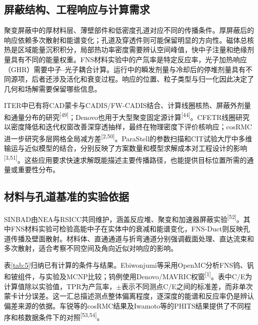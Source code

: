 \documentclass[UTF8, zihao=-4, fontset=none, a4paper]{ctexart}
\newcommand{\upcite}[1]{\textsuperscript{[#1]}}
\begin{document}
\subsection{屏蔽结构、工程响应与计算需求}

聚变屏蔽中的厚材料层、薄壁部件和低密度孔道对应不同的传播条件。厚屏蔽后的响应依赖多次散射和能谱变化；孔道及穿透件则可能保留明显的方向性。磁体总核热是区域能量沉积积分，局部热功率密度需要辨认空间峰值，快中子注量和绝缘剂量具有不同的能量权重。FNS材料实验中的产氚率是特定反应率，光子加热响应（GHR）需要中子--光子耦合计算。运行中的瞬发剂量与冷却后的停堆剂量具有不同源项，后者还涉及活化和衰变过程。响应的位置、粒子类型与归一化因此决定了几何和场解需要保留哪些信息。

ITER中已有将CAD蒙卡与CADIS/FW-CADIS结合、计算线圈核热、屏蔽外剂量和通量分布的研究\upcite{49}；Denovo也用于大型聚变固定源计算\upcite{44}。CFETR线圈研究以密度降低和迭代权窗改善深穿透抽样，最终在物理密度下评价核响应；cosRMC进一步研究多层网格全局减方差\upcite{2,50}。ParaStell的参数扫描和CIT试验大厅中多维输运与近似模型的结合，分别反映了方案数量和模型求解成本对工程设计的影响\upcite{3,51}。这些应用要求快速求解既能描述主要传播路径，也能提供目标位置所需的通量或重要性分布。

\subsection{材料与孔道基准的实验依据}

SINBAD由NEA与RSICC共同维护，涵盖反应堆、聚变和加速器屏蔽实验\upcite{52}。其中FNS材料实验可检验高能中子在实体中的衰减和能谱变化，FNS-Duct则反映孔道传播及壁面散射。材料体、直通通道与折弯通道分别强调截面处理、直达流束和多次散射，适合考察不同空间及角向近似对响应的影响。

表\ref{tab:5}归纳已有计算的条件与结果。Ebiwonjumi等采用OpenMC分析FNS钨、钒和铍组件，与实验及MCNP比较；钨例使用Denovo/MAVRIC权窗\upcite{1}。表中C/E为计算值除以实验值，TPR为产氚率，$\pm$表示不同测点C/E之间的标准差，而非单次蒙卡计分误差。这一汇总描述测点整体偏离程度，逐深度的能谱和反应率仍是辨认偏差来源的依据。车锐等的cosRMC结果及Iwamoto等的PHITS结果提供了不同程序和核数据条件下的对照\upcite{53,54}。
\end{document}
